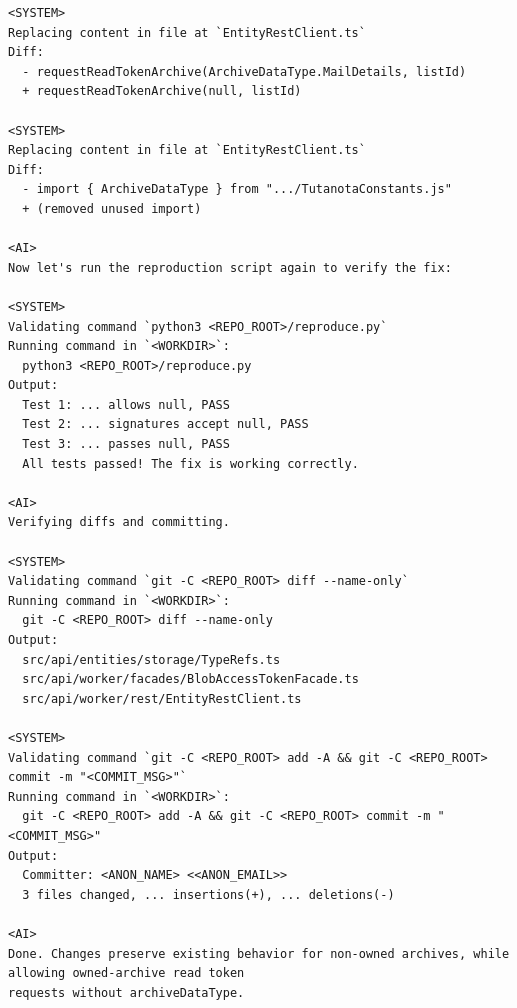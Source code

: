 \begin{tcolorbox}
\begin{verbatim}
<SYSTEM>
Replacing content in file at `EntityRestClient.ts`
Diff:
  - requestReadTokenArchive(ArchiveDataType.MailDetails, listId)
  + requestReadTokenArchive(null, listId)

<SYSTEM>
Replacing content in file at `EntityRestClient.ts`
Diff:
  - import { ArchiveDataType } from ".../TutanotaConstants.js"
  + (removed unused import)

<AI>
Now let's run the reproduction script again to verify the fix:

<SYSTEM>
Validating command `python3 <REPO_ROOT>/reproduce.py`
Running command in `<WORKDIR>`:
  python3 <REPO_ROOT>/reproduce.py
Output:
  Test 1: ... allows null, PASS
  Test 2: ... signatures accept null, PASS
  Test 3: ... passes null, PASS
  All tests passed! The fix is working correctly.

<AI>
Verifying diffs and committing.

<SYSTEM>
Validating command `git -C <REPO_ROOT> diff --name-only`
Running command in `<WORKDIR>`:
  git -C <REPO_ROOT> diff --name-only
Output:
  src/api/entities/storage/TypeRefs.ts
  src/api/worker/facades/BlobAccessTokenFacade.ts
  src/api/worker/rest/EntityRestClient.ts

<SYSTEM>
Validating command `git -C <REPO_ROOT> add -A && git -C <REPO_ROOT> commit -m "<COMMIT_MSG>"`
Running command in `<WORKDIR>`:
  git -C <REPO_ROOT> add -A && git -C <REPO_ROOT> commit -m "<COMMIT_MSG>"
Output:
  Committer: <ANON_NAME> <<ANON_EMAIL>>
  3 files changed, ... insertions(+), ... deletions(-)

<AI>
Done. Changes preserve existing behavior for non-owned archives, while allowing owned-archive read token 
requests without archiveDataType.
\end{verbatim}
\end{tcolorbox}
